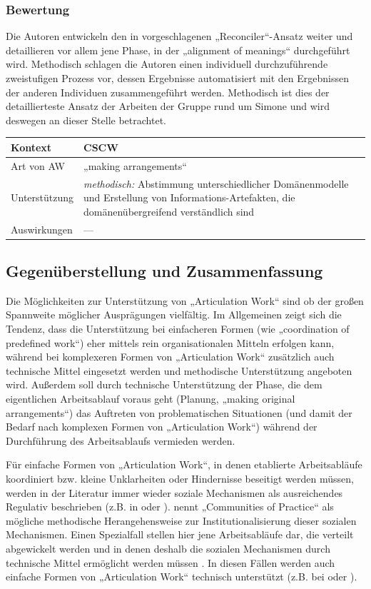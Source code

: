 \subsubsection{Bewertung}
Die Autoren entwickeln den in \citet{Sarini02} vorgeschlagenen „Reconciler“-Ansatz weiter und detaillieren vor allem jene Phase, in der „alignment of meanings“ durchgeführt wird. Methodisch schlagen die Autoren einen individuell durchzuführende zweistufigen Prozess vor, dessen Ergebnisse automatisiert mit den Ergebnissen der anderen Individuen zusammengeführt werden. Methodisch ist dies der detaillierteste Ansatz der Arbeiten der Gruppe rund um Simone und wird deswegen an dieser Stelle betrachtet.
\\[1em]
\begin{tabular}{| p{3cm} | p{10cm} |}
  \hline
  Kontext & \gls{CSCW} \\ \hline
  Art von AW & „making arrangements“ \\ \hline
  Unterstützung & \emph{methodisch:} Abstimmung unterschiedlicher Domänenmodelle und Erstellung von Informations-Artefakten, die domänenübergreifend verständlich sind \\ \hline
  Auswirkungen & --- \\ \hline
\end{tabular}

\subsection{Gegenüberstellung und Zusammenfassung} %
\label{sub:gegenüberstellung_und_zusammenfassung}

Die Möglichkeiten zur Unterstützung von „Articulation Work“ sind ob der großen Spannweite möglicher Ausprägungen vielfältig. Im Allgemeinen zeigt sich die Tendenz, dass die Unterstützung bei einfacheren Formen (wie „coordination of predefined work“) eher mittels rein organisationalen Mitteln erfolgen kann, während bei komplexeren Formen von „Articulation Work“ zusätzlich auch technische Mittel eingesetzt werden und methodische Unterstützung angeboten wird. Außerdem soll durch technische Unterstützung der Phase, die dem eigentlichen Arbeitsablauf voraus geht (Planung, „making original arrangements“) das Auftreten von problematischen Situationen (und damit der Bedarf nach komplexen Formen von „Articulation Work“) während der Durchführung des Arbeitsablaufs vermieden werden.

Für einfache Formen von „Articulation Work“, in denen etablierte Arbeitsabläufe koordiniert bzw. kleine Unklarheiten oder Hindernisse beseitigt werden müssen, werden in der Literatur immer wieder soziale Mechanismen als ausreichendes Regulativ beschrieben (z.B. in \citep{Raposo01} oder \citep{Schmidt94}). \citet{Davenport02} nennt „Communities of Practice“ \citep{Wenger99} als mögliche methodische Herangehensweise zur Institutionalisierung dieser sozialen Mechanismen. Einen Spezialfall stellen hier jene Arbeitsabläufe dar, die verteilt abgewickelt werden und in denen deshalb die sozialen Mechanismen durch technische Mittel ermöglicht werden müssen \citep{Faergemann05}. In diesen Fällen werden auch einfache Formen von „Articulation Work“ technisch unterstützt (z.B. bei \citep{Divitini00} oder \citep{Fuchs01}).

